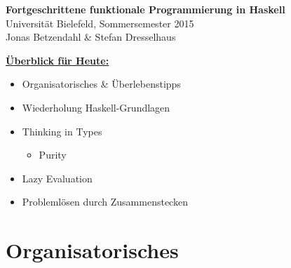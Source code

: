 \documentclass[unknownkeysallowed]{beamer}
\begin{document}
 
  

  \begin{frame}
    \huge\textbf{Fortgeschrittene funktionale Programmierung in Haskell}\\ \bigskip
    \LARGE Universität Bielefeld, Sommersemester 2015\\ \bigskip
    \large Jonas Betzendahl \& Stefan Dresselhaus
  \end{frame}

  
\begin{frame}
	\Large\textbf{\underline{Überblick für Heute:}}\bigskip \normalsize
	
	\begin{itemize}
	\item Organisatorisches \& Überlebenstipps
	\item Wiederholung Haskell-Grundlagen
	\item Thinking in Types
	      \begin{itemize}
	      \item Purity
	      \end{itemize}
	\item Lazy Evaluation
	\item Problemlösen durch Zusammenstecken
	\end{itemize}

\end{frame}

  \section{Organisatorisches}
  
\end{document}
